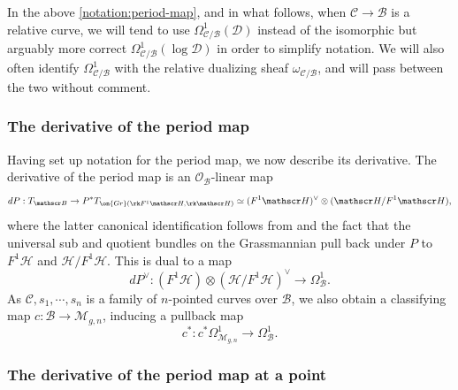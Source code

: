 \begin{remark}
\notready
	\label{remark:}
	In the above \autoref{notation:period-map}, and in what follows,
	when $\mathscr C \to \mathscr B$ is a relative curve, we will tend to use
	$\Omega^1_{\mathscr C/\mathscr B}(\mathscr D)$ instead of the isomorphic but arguably more correct
	$\Omega^1_{\mathscr C/\mathscr B}(\log \mathscr D)$
	in order to simplify notation.
	We will also often identify $\Omega^1_{\mathscr{C}/\mathscr{B}}$ with the relative dualizing sheaf $\omega_{\mathscr{C}/\mathscr{B}}$, and will pass between the two without comment.
\end{remark}

\subsubsection{The derivative of the period map}
\label{subsubsection:derivative-period-map-2}

Having set up notation for the period map, we now describe its derivative.
The derivative of the period map is an $\mathscr{O}_{\mathscr{B}}$-linear map
\begin{align*}
	dP : T_{\mathscr B} \to P^* T_{\on{Gr}(\rk F^1 \mathscr H, \rk \mathscr H)} \simeq (F^1
	\mathscr H)^\vee \otimes (\mathscr H/F^1 \mathscr H),
\end{align*}
where the latter canonical identification follows from \cite[Theorem 3.5]{eisenbudH:3264-all-that}
and the fact that the universal sub and quotient bundles on the Grassmannian
pull back under $P$ to $F^1 \mathscr H$ and
$\mathscr H/F^1 \mathscr H$.
This is dual to a map
$$dP^\vee: (F^1\mathscr{H})\otimes
(\mathscr{H}/F^1\mathscr{H})^\vee\to \Omega^1_{\mathscr B}.$$ As $\mathscr{C},
s_1, \cdots, s_n$ is a family of $n$-pointed curves over $\mathscr{B}$, we also
obtain a classifying map $c: \mathscr{B}\to \mathscr{M}_{g,n}$, inducing a
pullback map $$c^*: c^*\Omega^1_{\mathscr{M}_{g,n}}\to \Omega^1_{\mathscr B}.$$

\subsubsection{The derivative of the period map at a point}
\label{subsubsection:derivative-period-map}

